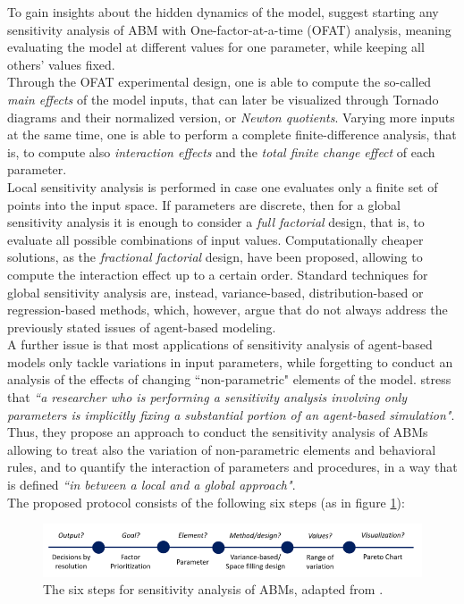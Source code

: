 To gain insights about the hidden dynamics of the model, \textcite{Broeke2016WhichSA} suggest starting any sensitivity analysis of ABM with One-factor-at-a-time (OFAT) analysis, meaning evaluating the model at different values for one parameter, while keeping all others' values fixed. \\ Through the OFAT experimental design, one is able to compute the so-called \textit{main effects} of the model inputs, that can later be visualized through Tornado diagrams and their normalized version, or \textit{Newton quotients}. Varying more inputs at the same time, one is able to perform a complete finite-difference analysis, that is, to compute also \textit{interaction effects} and the \textit{total finite change effect} of each parameter. \\ Local sensitivity analysis is performed in case one evaluates only a finite set of points into the input space. If parameters are discrete, then for a global sensitivity analysis it is enough to consider a \textit{full factorial} design, that is, to evaluate all possible combinations of input values. Computationally cheaper solutions, as the \textit{fractional factorial} design, have been proposed, allowing to compute the interaction effect up to a certain order. Standard techniques for global sensitivity analysis are, instead, variance-based, distribution-based or regression-based methods, which, however, \textcite{Broeke2016WhichSA} argue that do not always address the previously stated issues of agent-based modeling. \\ A further issue is that most applications of sensitivity analysis of agent-based models only tackle variations in input parameters, while forgetting to conduct an analysis of the effects of changing ``non-parametric" elements of the model. \textcite{Borgonovo2022SensitivityAO} stress that \textit{``a researcher who is performing a sensitivity analysis involving only parameters is implicitly fixing a substantial portion of an agent-based simulation"}. Thus, they propose an approach to conduct the sensitivity analysis of ABMs allowing to treat also the variation of non-parametric elements and behavioral rules, and to quantify the interaction of parameters and procedures, in a way that is defined \textit{``in between a local and a global approach"}. \\ The proposed protocol consists of the following six steps (as in figure \ref{fig:borgonovo_protocol}):

\begin{figure}[t!]
    \centering
    \includegraphics[width = \textwidth]{tex/pics/borgonovo_protocol.png}
    \caption{The six steps for sensitivity analysis of ABMs, adapted from \textcite{Borgonovo2022SensitivityAO}.}
    \label{fig:borgonovo_protocol}
\end{figure}

